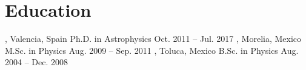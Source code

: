 \section{Education}

%
{\UVval, Valencia, Spain}%
{Ph.D. in Astrophysics}%
{Oct. 2011 -- Jul. 2017}%
{}%
{}
\cventry{}%
{\UMSNHes, Morelia, Mexico}%
{M.Sc. in Physics}%
{Aug. 2009 -- Sep. 2011}%
{}%
{}
%
{\UAEMes, Toluca, Mexico}%
{B.Sc. in Physics}%
{Aug. 2004 -- Dec. 2008}
{}%
{}
